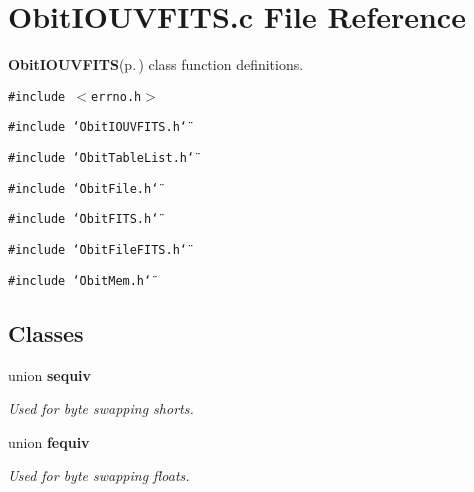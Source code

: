 \section{Obit\-IOUVFITS.c File Reference}
\label{ObitIOUVFITS_8c}
{\bf Obit\-IOUVFITS}{\rm (p.\,\pageref{structObitIOUVFITS})} class function definitions. 

{\tt \#include $<$errno.h$>$}\par
{\tt \#include \char`\"{}Obit\-IOUVFITS.h\char`\"{}}\par
{\tt \#include \char`\"{}Obit\-Table\-List.h\char`\"{}}\par
{\tt \#include \char`\"{}Obit\-File.h\char`\"{}}\par
{\tt \#include \char`\"{}Obit\-FITS.h\char`\"{}}\par
{\tt \#include \char`\"{}Obit\-File\-FITS.h\char`\"{}}\par
{\tt \#include \char`\"{}Obit\-Mem.h\char`\"{}}\par
\subsection*{Classes}
\begin{CompactItemize}
\item 
union {\bf sequiv}
\begin{CompactList}\small\item\em Used for byte swapping shorts. \item\end{CompactList}\item 
union {\bf fequiv}
\begin{CompactList}\small\item\em Used for byte swapping floats. \item\end{CompactList}\end{CompactItemize}
